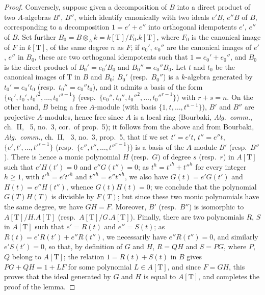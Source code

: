\begin{proof}
Conversely, suppose given a decomposition of $B$ into a direct product of two $A$-algebras $B'$, $B''$, which identify canonically with two ideals $e'B$, $e''B$ of $B$, corresponding to a decomposition $1=e'+e''$ into orthogonal idempotents $e'$, $e''$ of $B$.
Set further $B_0=B\otimes_A k=k[\mathrm{T}]/F_0.k[\mathrm{T}]$, where $F_0$ is the canonical image of $F$ in $k[\mathrm{T}]$, of the same degree $n$ as $F$;
if $e_0'$, $e_0''$ are the canonical images of $e'$, $e''$ in $B_0$, these are two orthogonal idempotents such that $1=e_0'+e_0''$, and $B_0$ is the direct product of $B_0'=e_0'B_0$ and $B_0''=e_0''B_0$.
Let $t$ and $t_0$ be the canonical images of $\mathrm{T}$ in $B$ and $B_0$;
$B_0'$ (resp.\ $B_0''$) is a $k$-algebra generated by $t_0'=e_0't_0$ (resp.\ $t_0''=e_0''t_0$), and it admits a basis of the form $\{e_0',t_0',t_0'^2,\ldots,t_0'^{s-1}\}$ (resp.\ $\{e_0'',t_0'',t_0''^2,\ldots,t_0''^{r-1}\}$) with $r+s=n$.
On the other hand, $B$ being a free $A$-module (with basis $\{1,t,\ldots,t^{n-1}\}$), $B'$ and $B''$ are projective $A$-modules, hence free since $A$ is a local ring (Bourbaki, \emph{Alg.\ comm.}, ch.~II, \textsection~5, no.~3, cor.\ of prop.~5);
it follows from the above and from Bourbaki, \emph{Alg.\ comm.}, ch.~II, \textsection~3, no.~3, prop.~5, that if we set $t'=e't$, $t''=e''t$, $\{e',t',\ldots,t'^{s-1}\}$ (resp.\ $\{e'',t'',\ldots,t''^{r-1}\}$) is a basis of the $A$-module $B'$ (resp.\ $B''$).
There is hence a monic polynomial $H$ (resp.\ $G$) of degree $s$ (resp.\ $r$) in $A[\mathrm{T}]$ such that $e'H(t')=0$ and $e''G(t'')=0$;
as $t^h=t'^h+t''^h$ for every integer $h\geq 1$, with $t'^h=e't'^h$ and $t''^h=e''t''^h$, we also have $G(t)=e'G(t')$ and $H(t)=e''H(t'')$, whence $G(t)H(t)=0$;
we conclude that the polynomial $G(T)H(T)$ is divisible by $F(T)$;
but since these two monic polynomials have the same degree, we have $GH=F$.
Moreover, $B'$ (resp.\ $B''$) is isomorphic to $A[\mathrm{T}]/H.A[\mathrm{T}]$ (resp.\ $A[\mathrm{T}]/G.A[\mathrm{T}]$).
Finally, there are two polynomials $R$, $S$ in $A[\mathrm{T}]$ such that $e'=R(t)$ and $e''=S(t)$;
as $R(t)=e'R(t')+e''R(t'')$, we necessarily have $e''R(t'')=0$, and similarly $e'S(t')=0$, so that, by definition of $G$ and $H$, $R=QH$ and $S=PG$, where $P$, $Q$ belong to $A[\mathrm{T}]$;
the relation $1=R(t)+S(t)$ in $B$ gives $PG+QH=1+LF$ for some polynomial $L\in A[\mathrm{T}]$, and since $F=GH$, this proves that the ideal generated by $G$ and $H$ is equal to $A[\mathrm{T}]$, and completes the proof of the lemma.
\end{proof}

